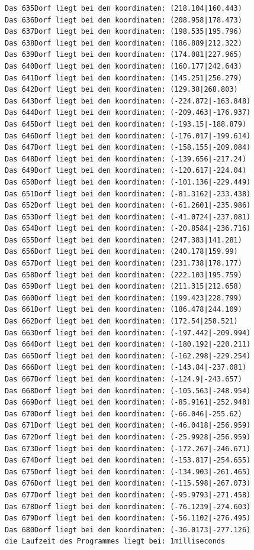 \documentclass{article}
\begin{document}
\begin{verbatim}
Das 635Dorf liegt bei den koordinaten: (218.104|160.443)
Das 636Dorf liegt bei den koordinaten: (208.958|178.473)
Das 637Dorf liegt bei den koordinaten: (198.535|195.796)
Das 638Dorf liegt bei den koordinaten: (186.889|212.322)
Das 639Dorf liegt bei den koordinaten: (174.081|227.965)
Das 640Dorf liegt bei den koordinaten: (160.177|242.643)
Das 641Dorf liegt bei den koordinaten: (145.251|256.279)
Das 642Dorf liegt bei den koordinaten: (129.38|268.803)
Das 643Dorf liegt bei den koordinaten: (-224.872|-163.848)
Das 644Dorf liegt bei den koordinaten: (-209.463|-176.937)
Das 645Dorf liegt bei den koordinaten: (-193.15|-188.879)
Das 646Dorf liegt bei den koordinaten: (-176.017|-199.614)
Das 647Dorf liegt bei den koordinaten: (-158.155|-209.084)
Das 648Dorf liegt bei den koordinaten: (-139.656|-217.24)
Das 649Dorf liegt bei den koordinaten: (-120.617|-224.04)
Das 650Dorf liegt bei den koordinaten: (-101.136|-229.449)
Das 651Dorf liegt bei den koordinaten: (-81.3162|-233.438)
Das 652Dorf liegt bei den koordinaten: (-61.2601|-235.986)
Das 653Dorf liegt bei den koordinaten: (-41.0724|-237.081)
Das 654Dorf liegt bei den koordinaten: (-20.8584|-236.716)
Das 655Dorf liegt bei den koordinaten: (247.383|141.281)
Das 656Dorf liegt bei den koordinaten: (240.178|159.99)
Das 657Dorf liegt bei den koordinaten: (231.738|178.177)
Das 658Dorf liegt bei den koordinaten: (222.103|195.759)
Das 659Dorf liegt bei den koordinaten: (211.315|212.658)
Das 660Dorf liegt bei den koordinaten: (199.423|228.799)
Das 661Dorf liegt bei den koordinaten: (186.478|244.109)
Das 662Dorf liegt bei den koordinaten: (172.54|258.521)
Das 663Dorf liegt bei den koordinaten: (-197.442|-209.994)
Das 664Dorf liegt bei den koordinaten: (-180.192|-220.211)
Das 665Dorf liegt bei den koordinaten: (-162.298|-229.254)
Das 666Dorf liegt bei den koordinaten: (-143.84|-237.081)
Das 667Dorf liegt bei den koordinaten: (-124.9|-243.657)
Das 668Dorf liegt bei den koordinaten: (-105.563|-248.954)
Das 669Dorf liegt bei den koordinaten: (-85.9161|-252.948)
Das 670Dorf liegt bei den koordinaten: (-66.046|-255.62)
Das 671Dorf liegt bei den koordinaten: (-46.0418|-256.959)
Das 672Dorf liegt bei den koordinaten: (-25.9928|-256.959)
Das 673Dorf liegt bei den koordinaten: (-172.267|-246.671)
Das 674Dorf liegt bei den koordinaten: (-153.817|-254.655)
Das 675Dorf liegt bei den koordinaten: (-134.903|-261.465)
Das 676Dorf liegt bei den koordinaten: (-115.598|-267.073)
Das 677Dorf liegt bei den koordinaten: (-95.9793|-271.458)
Das 678Dorf liegt bei den koordinaten: (-76.1239|-274.603)
Das 679Dorf liegt bei den koordinaten: (-56.1102|-276.495)
Das 680Dorf liegt bei den koordinaten: (-36.0173|-277.126)
die Laufzeit des Programmes liegt bei: 1milliseconds

\end{verbatim}
\end{document}
